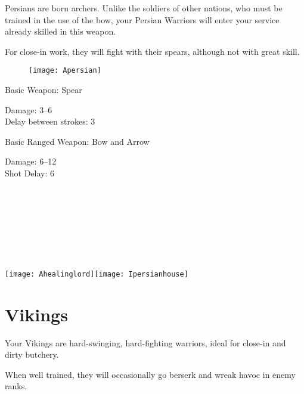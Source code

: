 
Persians are born archers. Unlike the soldiers of other nations, who must be trained in the use of the bow, your Persian Warriors will enter your service already skilled in this weapon.

For close-in work, they will fight with their spears, although not with great skill.

\begin{wrapfigure}{r}{0.5\textwidth}
	\begin{center}
		\vspace{-20pt}
		\texttt{[image: Apersian]}
	\end{center}
	\vspace{-20pt}
\end{wrapfigure}

Basic Weapon: Spear
\begin{adjustwidth}{1cm}{}
	Damage: 3–6 \\
	Delay between strokes: 3
\end{adjustwidth}
Basic Ranged Weapon: Bow and Arrow
\begin{adjustwidth}{1cm}{}
	Damage: 6–12 \\
	Shot Delay: 6 \\ \\ \\ \\ \\ \\ \\ \\ 
\end{adjustwidth}

\begin{center}
	\texttt{[image: Ahealinglord]}\texttt{[image: Ipersianhouse]}
\end{center}

\clearpage

\section{Vikings}


Your Vikings are hard-swinging, hard-fighting warriors, ideal for close-in and dirty butchery.

When well trained, they will occasionally go berserk and wreak havoc in enemy ranks.

